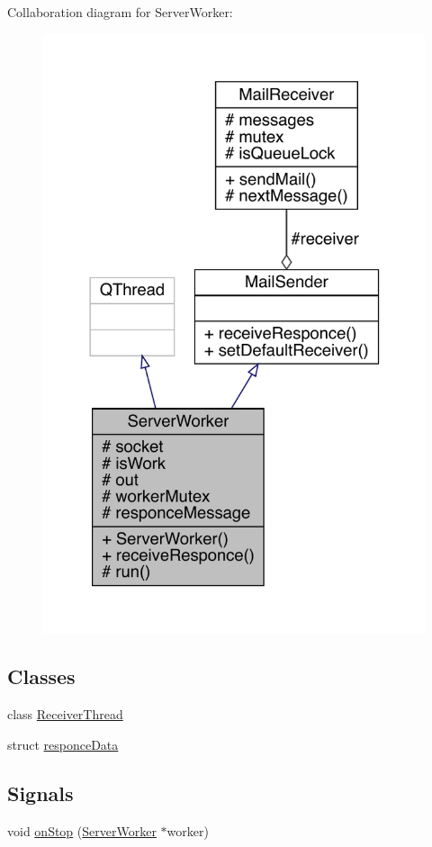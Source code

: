 Collaboration diagram for Server\+Worker\+:
\nopagebreak
\begin{figure}[H]
\begin{center}
\leavevmode
\includegraphics[width=324pt]{dc/d52/a00183}
\end{center}
\end{figure}
\subsection*{Classes}
\begin{DoxyCompactItemize}
\item 
class \hyperlink{a00193}{Receiver\+Thread}
\item 
struct \hyperlink{a00189}{responce\+Data}
\end{DoxyCompactItemize}
\subsection*{Signals}
\begin{DoxyCompactItemize}
\item 
void \hyperlink{a00185_ab80ef665f93d81c71a83aa42f8d888df}{on\+Stop} (\hyperlink{a00185}{Server\+Worker} $\ast$worker)
\end{DoxyCompactItemize}
